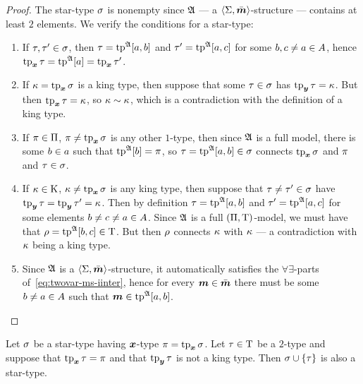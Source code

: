 \begin{proof}
The star-type $\sigma$ is nonempty since $\mathfrak{A}$ --- a
$\left\langle \mathrm{\Sigma},\bar{\bm{m}} \right\rangle$-structure --- contains at least $2$ elements. We verify the
conditions for a star-type:
\begin{enumerate}
  \item If $\tau, {\tau'} \in \sigma$, then $\tau = \operatorname{tp}^{\mathfrak{A}}[a,b]$ and
  ${\tau'} = \operatorname{tp}^{\mathfrak{A}}[a,c]$ for some $b,c\neq a\in A$, hence
  $\operatorname{tp}_{\bm{x}}\tau = \operatorname{tp}^{\mathfrak{A}}[a] = \operatorname{tp}_{\bm{x}}{\tau'}$.
  \item If $\kappa = \operatorname{tp}_{\bm{x}}\sigma$ is a king type, then suppose that some $\tau
  \in \sigma$ has $\operatorname{tp}_{\bm{y}}\tau = \kappa$. But then $\operatorname{tp}_{\bm{x}}\tau = \kappa$, so $\kappa
  \sim \kappa$, which is a contradiction with the definition of a king type.
  \item If $\pi \in \Pi$, $\pi \neq \operatorname{tp}_{\bm{x}}\sigma$ is any other $1$-type, then
  since $\mathfrak{A}$ is a full model, there is some $b \in a$ such that
  $\operatorname{tp}^{\mathfrak{A}}[b] = \pi$, so $\tau = \operatorname{tp}^{\mathfrak{A}}[a,b] \in \sigma$ connects
  $\operatorname{tp}_{\bm{x}}\sigma$ and $\pi$ and $\tau \in \sigma$.
  \item If $\kappa \in \mathrm{K}$, $\kappa \neq \operatorname{tp}_{\bm{x}}\sigma$ is any king type, then
  suppose that $\tau \neq {\tau'} \in \sigma$ have $\operatorname{tp}_{\bm{y}}\tau = \operatorname{tp}_{\bm{y}}{\tau'} =
  \kappa$. Then by definition $\tau = \operatorname{tp}^{\mathfrak{A}}[a,b]$ and ${\tau'} =
  \operatorname{tp}^{\mathfrak{A}}[a,c]$ for some elements $b \neq c \neq a \in A$. Since
  $\mathfrak{A}$ is a full $(\Pi,\mathrm{T})$-model, we must have that $\rho =
  \operatorname{tp}^{\mathfrak{A}}[b,c] \in \mathrm{T}$. But then $\rho$ connects $\kappa$ with $\kappa$
  --- a contradiction with $\kappa$ being a king type.
  \item Since $\mathfrak{A}$ is a $\left\langle \mathrm{\Sigma},\bar{\bm{m}} \right\rangle$-structure, it automatically
  satisfies the $\forall\exists$-parts of~\cref{eq:twovar-ms-iinter}, hence for 
  every $\bm{m} \in \bar{\bm{m}}$ there must be some $b \neq a \in A$ such that
  $\bm{m} \in \operatorname{tp}^{\mathfrak{A}}[a,b]$.
\end{enumerate}
\end{proof}

\begin{remark}\label{rem:star-type-ext}
Let $\sigma$ be a star-type having $\bm{x}$-type $\pi = \operatorname{tp}_{\bm{x}}\sigma$.
Let $\tau \in \mathrm{T}$ be a $2$-type and suppose that $\operatorname{tp}_{\bm{x}}\tau = \pi$ and
that $\operatorname{tp}_{\bm{y}}\tau$ is not a king type.
Then $\sigma \cup \left\{\tau\right\}$ is also a star-type.
\end{remark}


